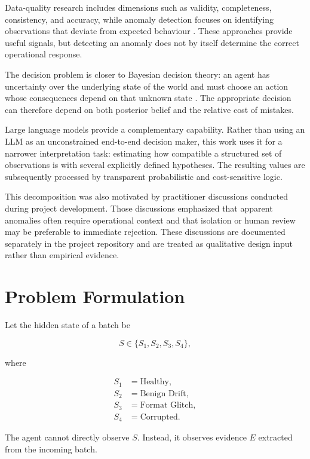 \documentclass{article}
\begin{document}
Data-quality research includes dimensions such as validity, completeness, consistency, and accuracy, while anomaly detection focuses on identifying observations that deviate from expected behaviour \cite{batini2009methodologies,chandola2009anomaly}. These approaches provide useful signals, but detecting an anomaly does not by itself determine the correct operational response.

The decision problem is closer to Bayesian decision theory: an agent has uncertainty over the underlying state of the world and must choose an action whose consequences depend on that unknown state \cite{berger1985statistical}. The appropriate decision can therefore depend on both posterior belief and the relative cost of mistakes.

Large language models provide a complementary capability. Rather than using an LLM as an unconstrained end-to-end decision maker, this work uses it for a narrower interpretation task: estimating how compatible a structured set of observations is with several explicitly defined hypotheses. The resulting values are subsequently processed by transparent probabilistic and cost-sensitive logic.

This decomposition was also motivated by practitioner discussions conducted during project development. Those discussions emphasized that apparent anomalies often require operational context and that isolation or human review may be preferable to immediate rejection. These discussions are documented separately in the project repository and are treated as qualitative design input rather than empirical evidence.


\section{Problem Formulation}

Let the hidden state of a batch be

\[
S \in
\{
S_1,S_2,S_3,S_4
\},
\]

where

\begin{align*}
S_1 &= \text{Healthy},\\
S_2 &= \text{Benign Drift},\\
S_3 &= \text{Format Glitch},\\
S_4 &= \text{Corrupted}.
\end{align*}

The agent cannot directly observe \(S\). Instead, it observes evidence \(E\) extracted from the incoming batch.
\end{document}

